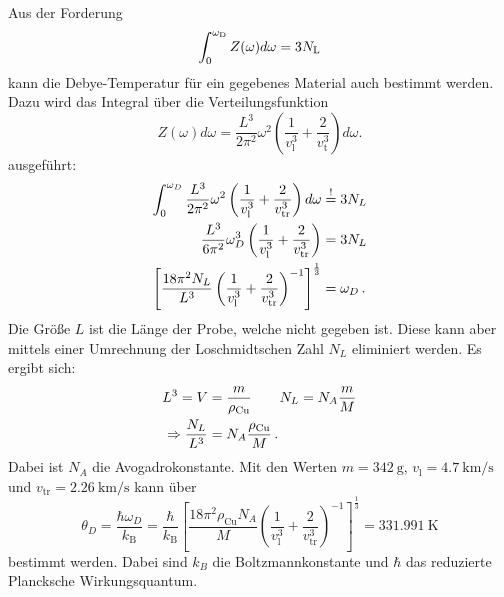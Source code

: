 Aus der Forderung 
\begin{equation}
    \int_0^{\omega_\text D} Z(\omega) d\omega = 3 N_\text L
\end{equation}
kann die Debye-Temperatur für ein gegebenes Material auch bestimmt werden. Dazu wird das Integral über die Verteilungsfunktion 
\begin{equation}
    Z(\omega)d\omega = \frac{L^3}{2\pi^2}\omega^2\left(\frac{1}{v_\text{l}^3}+\frac{2}{v_{\text{t}}^3}\right)d\omega.
\end{equation}
ausgeführt:
\begin{align*}
	\int_0^{\omega_D} \frac{L^3}{2\pi^2}\omega^2\left(\frac{1}{v_\text{l}^3}+\frac{2}{v_\text{tr}^3}\right) d\omega &\overset{!}{=} 3 N_L\\
	\frac{L^3}{6\pi^2}\omega_D^3\left(\frac{1}{v_\text{l}^3}+\frac{2}{v_\text{tr}^3}\right)  &= 3N_L\\
	\left[\frac{18\pi^2N_L}{L^3}\left(\frac{1}{v_\text{l}^3}+\frac{2}{v_\text{tr}^3}\right)^{-1} \right]^{\frac{1}{3}} &= \omega_D \,\text.
\end{align*}
Die Größe $L$ ist die Länge der Probe, welche nicht gegeben ist. Diese kann aber mittels einer Umrechnung der Loschmidtschen Zahl $N_L$ eliminiert werden. Es ergibt sich:
\begin{align*}
	L^3 = V &= \frac{m}{\rho_\text{Cu}}\qquad N_L = N_A\frac{m}{M}\\
	\Rightarrow \frac{N_L}{L^3} &= N_A\frac{\rho_\text{Cu}}{M}\,\text.
\end{align*}
Dabei ist $N_A$ die Avogadrokonstante.
Mit den Werten $m = \SI{342}{\gram}$, $v_\text{l} = \SI{4.7}{\kilo\metre\per\second}$ und $v_\text{tr} = \SI{2.26}{\kilo\meter\per\second}$ kann über
\begin{equation*}
	\theta_D = \frac{\hbar\omega_D}{k_\text{B}}= \frac{\hbar}{k_\text{B}}\left[\frac{18\pi^2\rho_\text{Cu} N_A}{M}\left(\frac{1}{v_\text{l}^3}+\frac{2}{v_\text{tr}^3}\right)^{-1} \right]^{\frac{1}{3}} = \SI{331.991}{\kelvin}
\end{equation*} bestimmt werden. Dabei sind $k_B$ die Boltzmannkonstante und $\hbar$ das reduzierte Plancksche Wirkungsquantum.

